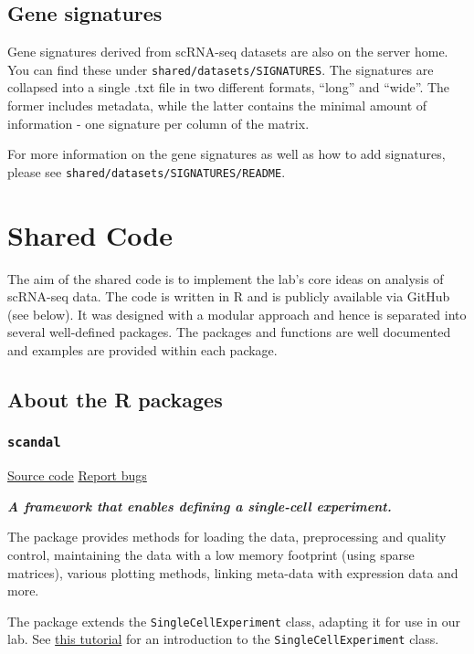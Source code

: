 \documentclass[]{book}
\begin{document}
\section{Gene signatures}\label{gene-signatures}

Gene signatures derived from scRNA-seq datasets are also on the server
home. You can find these under \texttt{shared/datasets/SIGNATURES}. The
signatures are collapsed into a single .txt file in two different
formats, ``long'' and ``wide''. The former includes metadata, while the
latter contains the minimal amount of information - one signature per
column of the matrix.

For more information on the gene signatures as well as how to add
signatures, please see \texttt{shared/datasets/SIGNATURES/README}.

\chapter{Shared Code}\label{sharedCode}

The aim of the shared code is to implement the lab's core ideas on
analysis of scRNA-seq data. The code is written in R and is publicly
available via GitHub (see below). It was designed with a modular
approach and hence is separated into several well-defined packages. The
packages and functions are well documented and examples are provided
within each package.

\section{About the R packages}\label{about-the-r-packages}

\subsection{\texorpdfstring{\texttt{scandal}}{scandal}}\label{scandal}

\href{https://github.com/dravishays/scandal}{Source code} \textbar{}
\href{https://github.com/dravishays/scandal/issues}{Report bugs}

\emph{\textbf{A framework that enables defining a single-cell
experiment.}}

The package provides methods for loading the data, preprocessing and
quality control, maintaining the data with a low memory footprint (using
sparse matrices), various plotting methods, linking meta-data with
expression data and more.

The package extends the \texttt{SingleCellExperiment} class, adapting it
for use in our lab. See
\href{https://www.bioconductor.org/packages/release/bioc/vignettes/SingleCellExperiment/inst/doc/intro.html}{this
tutorial} for an introduction to the \texttt{SingleCellExperiment}
class.
\end{document}
